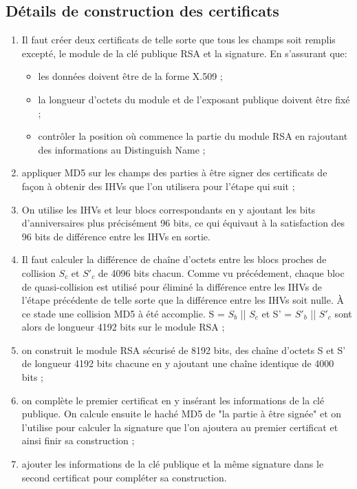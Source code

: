 \subsection{Détails de construction des certificats}
\begin{enumerate}
\item Il faut créer deux certificats de telle sorte que tous les champs soit remplis excepté, le module de la clé publique RSA et la signature. En s'assurant que:
 \begin{itemize} 
 \item les données doivent être de la forme X.509 ;
 \item la longueur d'octets du module et de l'exposant publique doivent être fixé ;
 \item contrôler la position où commence la partie du module RSA en rajoutant des informations au Distinguish Name ;
\end{itemize}
\item appliquer MD5 sur les champs des parties à être signer des certificats de façon à obtenir des IHVs que l'on utilisera pour l'étape qui suit ;
\item On utilise les IHVs et leur blocs correspondants en y ajoutant les bits d'anniversaires plus précisément 96 bits, ce qui équivaut à la satisfaction des 96 bits de différence entre les IHVs en sortie.
\item Il faut calculer la différence de chaîne d'octets entre les blocs proches de collision $S_{c}$ et $S'_{c}$ de 4096 bits chacun. Comme vu précédement, chaque bloc de quasi-collision est utilisé pour éliminé la différence entre les IHVs de l'étape précédente de telle sorte que la différence entre les IHVs soit nulle. À ce stade une collision MD5 à été accomplie. S = $S_{b}$ || $S_{c}$ et S' = $S'_{b}$ || $S'_{c}$ sont alors de longueur 4192 bits sur le module RSA ;
\item on construit le module RSA sécurisé de 8192 bits, des chaîne d'octets S et S' de longueur 4192 bits chacune en y ajoutant une chaîne identique de 4000 bits ;
\item on complète le premier certificat en y insérant les informations de la clé publique. On calcule ensuite le haché MD5 de "la partie à être signée" et on l'utilise pour calculer la signature que l'on ajoutera au premier certificat et ainsi finir sa construction ;
\item ajouter les informations de la clé publique et la même signature dans le second certificat pour compléter sa construction.	
\end{enumerate}
\vspace{.5cm}


